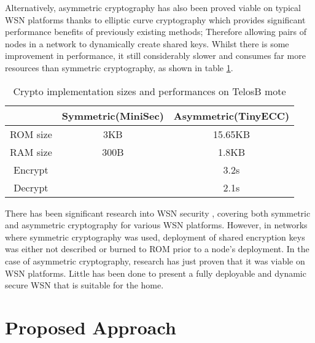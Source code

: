 \documentclass{mprop}
\begin{document}
Alternatively, asymmetric cryptography has also been proved viable on typical WSN platforms thanks to elliptic curve cryptography which provides significant performance benefits of previously existing methods\cite{TinyECC}; Therefore allowing pairs of nodes in a network to dynamically create shared keys. Whilst there is some improvement in performance, it still considerably slower and consumes far more resources than symmetric cryptography, as shown in table \ref{tab:crypto_compare}.

\begin{table}[h] %
  \begin{center} 
  \label{tab:crypto_compare}
  \begin{tabular}{|c|c|c|} 
  \hline
           & Symmetric(MiniSec) & Asymmetric(TinyECC) \\ \hline
  ROM size & 3KB                & 15.65KB \\ \hline
  RAM size & 300B               & 1.8KB \\ \hline
  Encrypt  &                    & 3.2s \\ \hline 
  Decrypt  &                    & 2.1s \\ \hline
  \end{tabular}
  \caption{Crypto implementation sizes and performances on TelosB mote}
  \end{center}
\end{table}

There has been significant research into WSN security \cite{TinySec, luk2007minisec, ContikiSec, TinyECC,MessageBottle, CertificatePairwise, Karlof_Wagner_2003, SecurityInWSN}, covering both symmetric and asymmetric cryptography for various WSN platforms. However, in networks where symmetric cryptography was used, deployment of shared encryption keys was either not described or burned to ROM\cite{TinySec, luk2007minisec, ContikiSec} prior to a node's deployment. In the case of asymmetric cryptography, research has just proven that it was viable on WSN platforms\cite{TinyECC}. Little has been done to present a fully deployable and dynamic secure WSN that is suitable for the home. 



\section{Proposed Approach}
\end{document}

